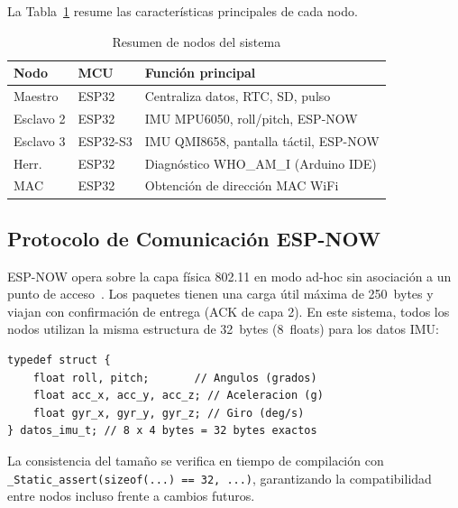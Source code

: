 \documentclass[10pt,twocolumn,a4paper]{article}
\begin{document}
La Tabla~\ref{tab:nodos} resume las características principales de
cada nodo.

\begin{table}[H]
\centering
\caption{Resumen de nodos del sistema}
\label{tab:nodos}
\scriptsize
\begin{tabular}{p{1.2cm}p{1.4cm}p{3.1cm}}
\toprule
\textbf{Nodo} & \textbf{MCU} & \textbf{Función principal} \\
\midrule
Maestro & ESP32 & Centraliza datos, RTC, SD, pulso \\
Esclavo 2 & ESP32 & IMU MPU6050, roll/pitch, ESP-NOW \\
Esclavo 3 & ESP32-S3 & IMU QMI8658, pantalla táctil, ESP-NOW \\
Herr. & ESP32 & Diagnóstico WHO\_AM\_I (Arduino IDE) \\
MAC & ESP32 & Obtención de dirección MAC WiFi \\
\bottomrule
\end{tabular}
\end{table}

\subsection{Protocolo de Comunicación ESP-NOW}

ESP-NOW opera sobre la capa física 802.11 en modo ad-hoc sin
asociación a un punto de acceso~\cite{espnow_docs}. Los paquetes
tienen una carga útil máxima de 250~bytes y viajan con confirmación
de entrega (ACK de capa 2). En este sistema, todos los nodos utilizan
la misma estructura de 32~bytes (8~floats) para los datos IMU:

\begin{lstlisting}[style=csrc, numbers=none,
  caption={Estructura de datos transmitida por ESP-NOW (32 bytes)},
  label=lst:struct]
typedef struct {
    float roll, pitch;       // Angulos (grados)
    float acc_x, acc_y, acc_z; // Aceleracion (g)
    float gyr_x, gyr_y, gyr_z; // Giro (deg/s)
} datos_imu_t; // 8 x 4 bytes = 32 bytes exactos
\end{lstlisting}

La consistencia del tamaño se verifica en tiempo de compilación con
\texttt{\_Static\_assert(sizeof(...) == 32, ...)}, garantizando la
compatibilidad entre nodos incluso frente a cambios futuros.

\end{document}
